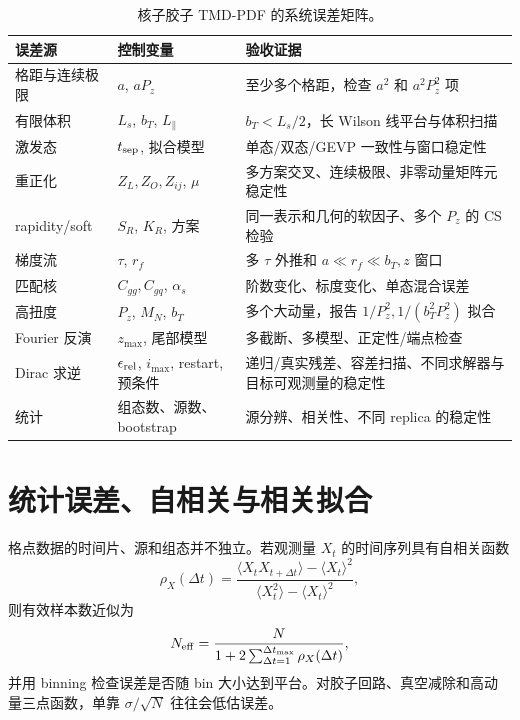 \documentclass[UTF8,12pt,a4paper,twoside,openany]{ctexbook}
\begin{document}
\begin{table}[htbp]
\centering
\caption{核子胶子 TMD-PDF 的系统误差矩阵。}
\label{tab:errors}
\small
\begin{tabularx}{\textwidth}{L{3.0cm}L{3.3cm}Y}
\toprule
误差源 & 控制变量 & 验收证据 \\
\midrule
格距与连续极限 & \(a\), \(aP_z\) & 至少多个格距，检查 \(a^2\) 和 \(a^2P_z^2\) 项 \\
有限体积 & \(L_s\), \(b_T\), \(L_\parallel\) & \(b_T<L_s/2\)，长 Wilson 线平台与体积扫描 \\
激发态 & \(t_{\rm sep}\), 拟合模型 & 单态/双态/GEVP 一致性与窗口稳定性 \\
重正化 & \(Z_L,Z_O,Z_{ij}\), \(\mu\) & 多方案交叉、连续极限、非零动量矩阵元稳定性 \\
rapidity/soft & \(S_R\), \(K_R\), 方案 & 同一表示和几何的软因子、多个 \(P_z\) 的 CS 检验 \\
梯度流 & \(\tau\), \(r_f\) & 多 \(\tau\) 外推和 \(a\ll r_f\ll b_T,z\) 窗口 \\
匹配核 & \(C_{gg},C_{gq}\), \(\alpha_s\) & 阶数变化、标度变化、单态混合误差 \\
高扭度 & \(P_z\), \(M_N\), \(b_T\) & 多个大动量，报告 \(1/P_z^2,1/(b_T^2P_z^2)\) 拟合 \\
Fourier 反演 & \(z_{\max}\), 尾部模型 & 多截断、多模型、正定性/端点检查 \\
Dirac 求逆 & \(\epsilon_{\rm rel}\), \(i_{\max}\), restart, 预条件 & 递归/真实残差、容差扫描、不同求解器与目标可观测量的稳定性 \\
统计 & 组态数、源数、bootstrap & 源分辨、相关性、不同 replica 的稳定性 \\
\bottomrule
\end{tabularx}
\end{table}

\section{统计误差、自相关与相关拟合}

格点数据的时间片、源和组态并不独立。若观测量 \(X_t\) 的时间序列具有自相关函数
\begin{equation}
  \rho_X(\Delta t)
  =\frac{\langle X_tX_{t+\Delta t}\rangle-\langle X_t\rangle^2}
  {\langle X_t^2\rangle-\langle X_t\rangle^2},
  \label{eq:autocorr}
\end{equation}
则有效样本数近似为
\begin{equation}
  N_{\rm eff}
  =\frac{N}{1+2\sum_{\Delta t=1}^{\Delta t_{\max}}\rho_X(\Delta t)},
  \label{eq:neff}
\end{equation}
并用 binning 检查误差是否随 bin 大小达到平台。对胶子回路、真空减除和高动量三点函数，单靠 \(\sigma/\sqrt{N}\) 往往会低估误差。
\end{document}
